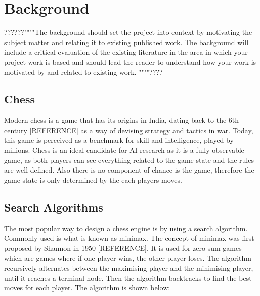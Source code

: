 \chapter{Background}
??????""""The background should set the project into context by motivating the subject matter and relating it to existing published work. The background will include a critical evaluation of the existing literature in the area in which your project work is based and should lead the reader to understand how your work is motivated by and related to existing work.
""""????
\section{Chess}
Modern chess is a game that has its origins in India, dating back to the 6th century [REFERENCE] as a way of devising strategy and tactics in war. Today, this game is perceived as a benchmark for skill and intelligence, played by millions. Chess is an ideal candidate for AI research as it is a fully observable game, as both players can see everything related to the game state and the rules are well defined. Also there is no component of chance is the game, therefore the game state is only determined by the each players moves.


\section{Search Algorithms}
The most popular way to design a chess engine is by using a search algorithm. Commonly used is what is known as minimax. The concept of minimax was first proposed by Shannon in 1950 [REFERENCE]. It is used for zero-sum games which are games where if one player wins, the other player loses. The algorithm recursively alternates between the maximising player and the minimising player, until it reaches a terminal node. Then the algorithm backtracks to find the best moves for each player. The algorithm is shown below:


